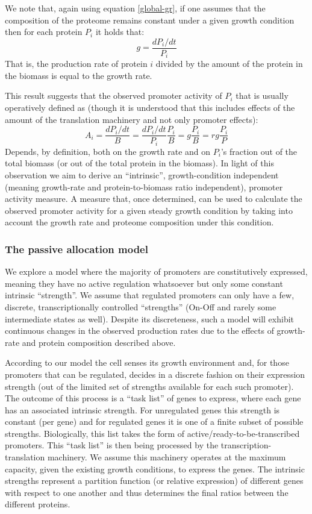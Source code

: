 \documentclass{report}
\begin{document}
We note that, again using equation \ref{global-gr}, if one assumes that the composition of the proteome remains constant under a given growth condition then for each protein $P_i$ it holds that:
\[g=\frac{dP_i/dt}{P_i}\]
That is, the production rate of protein $i$ divided by the amount of the protein in the biomass is equal to the growth rate.

This result suggests that the observed promoter activity of $P_i$ that is usually operatively defined as (though it is understood that this includes effects of the amount of the translation machinery and not only promoter effects):
\[A_i=\frac{dP_i/dt}{B}=\frac{dP_i/dt}{P_i}\frac{P_i}{B}=g\frac{P_i}{B}=rg\frac{P_i}{P}\]
Depends, by definition, both on the growth rate and on $P_i$’s fraction out of the total biomass (or out of the total protein in the biomass).
In light of this observation we aim to derive an “intrinsic”, growth-condition independent (meaning growth-rate and protein-to-biomass ratio independent), promoter activity measure.
A measure that, once determined, can be used to calculate the observed promoter activity for a given steady growth condition by taking into account the growth rate and proteome composition under this condition.
\subsubsection{The passive allocation model}
We explore a model where the majority of promoters are constitutively expressed, meaning they have no active regulation whatsoever but only some constant intrinsic “strength”.
We assume that regulated promoters can only have a few, discrete, transcriptionally controlled “strengths” (On-Off and rarely some intermediate states as well).
Despite its discreteness, such a model will exhibit continuous changes in the observed production rates due to the effects of growth-rate and protein composition described above.

According to our model the cell senses its growth environment and, for those promoters that can be regulated, decides in a discrete fashion on their expression strength (out of the limited set of strengths available for each such promoter).
The outcome of this process is a “task list” of genes to express, where each gene has an associated intrinsic strength.
For unregulated genes this strength is constant (per gene) and for regulated genes it is one of a finite subset of possible strengths.
Biologically, this list takes the form of active/ready-to-be-transcribed promoters.
This “task list” is then being processed by the transcription-translation machinery.
We assume this machinery operates at the maximum capacity, given the existing growth conditions, to express the genes.
The intrinsic strengths represent a partition function (or relative expression) of different genes with respect to one another and thus determines the final ratios between the different proteins.
\end{document}
